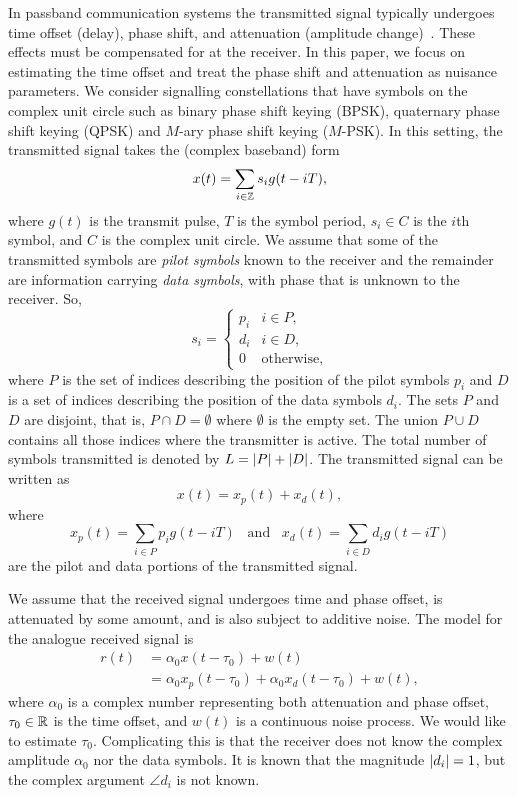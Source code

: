 \documentclass[journal]{IEEEtranTCOM}
\begin{document}
In passband communication systems the transmitted signal typically undergoes time offset (delay), phase shift, and attenuation (amplitude change)~\cite{Mengali_andre_synchro_book,Meyr_synchro_book_1998}.  These effects must be compensated for at the receiver. In this paper, we focus on estimating the time offset and treat the phase shift and attenuation as nuisance parameters.  We consider signalling constellations that have symbols on the complex unit circle such as binary phase shift keying (BPSK), quaternary phase shift keying (QPSK) and $M$-ary phase shift keying ($M$-PSK).  In this setting, the transmitted signal takes the (complex baseband) form
\[
x(t) = \sum_{i \in {\mathbb Z}} s_i g(t - iT),
\]
where $g(t)$ is the transmit pulse, $T$ is the symbol period, $s_i \in C$ is the $i$th symbol, and $C$ is the complex unit circle. %
We assume that some of the transmitted symbols are \emph{pilot symbols} known to the receiver and the remainder are information carrying \emph{data symbols}, with phase that is unknown to the receiver.  So,
\[
s_i = \begin{cases}
p_i & i \in P, \\
d_i & i \in D, \\
0 & \text{otherwise},
\end{cases}
\]
where $P$ is the set of indices describing the position of the pilot symbols $p_i$ and $D$ is a set of indices describing the position of the data symbols $d_i$.  The sets $P$ and $D$ are disjoint, that is, $P \cap D = \emptyset$ where $\emptyset$ is the empty set.  The union $P \cup D$ contains all those indices where the transmitter is active.  %
The total number of symbols transmitted is denoted by $L = {\left\vert P \right\vert} + {\left\vert D \right\vert}$.  The transmitted signal can be written as
\[
x(t) = x_p(t) + x_d(t),
\]
where
\[
x_p(t) = \sum_{i \in P} p_i g(t - iT) \;\;\; \text{and} \;\;\; x_d(t) = \sum_{i \in D} d_i g(t - iT)
\]
are the pilot and data portions of the transmitted signal.

We assume that the received signal undergoes time and phase offset, is attenuated by some amount, and is also subject to additive noise.  The model for the analogue received signal is
\begin{equation}
\begin{split}\label{eq:sigmodnoise}
r(t) &= \alpha_0 x(t - \tau_0) + w(t) \\
&= \alpha_0 x_p(t - \tau_0) + \alpha_0 x_d(t - \tau_0) + w(t),
\end{split}
\end{equation}
where $\alpha_0$ is a complex number representing both attenuation and phase offset, $\tau_0 \in {\mathbb R}$ is the time offset, and $w(t)$ is a continuous noise process.  We would like to estimate $\tau_0$.  Complicating this is that the receiver does not know the complex amplitude $\alpha_0$ nor the data symbols.  It is known that the magnitude ${\left\vert d_i \right\vert} = 1$, but the complex argument $\angle d_i$ is not known.
\end{document}
